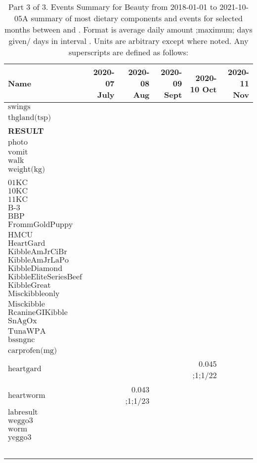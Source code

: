 \begin{table}[H]
\centering
\begin{tabular}{|l|r|r|r|r|r|}
\hline
Name&2020-07 July&2020-08 Aug&2020-09 Sept&2020-10 Oct&2020-11 Nov\\
\hline
$\textrm{swings}$&&&&&\\
$\textrm{thgland(tsp)}$&&&&&\\
{\bf RESULT}&&&&&\\
$\textrm{photo}$&&&&&\\
$\textrm{vomit}$&&&&&\\
$\textrm{walk}$&&&&&\\
$\textrm{weight(kg)}$&&&&&\\
&&&&&\\
$\textrm{01KC}$&&&&&\\
$\textrm{10KC}$&&&&&\\
$\textrm{11KC}$&&&&&\\
$\textrm{B-3}$&&&&&\\
$\textrm{BBP}$&&&&&\\
$\textrm{FrommGoldPuppy}$&&&&&\\
$\textrm{HMCU}$&&&&&\\
$\textrm{HeartGard}$&&&&&\\
$\textrm{KibbleAmJrCiBr}$&&&&&\\
$\textrm{KibbleAmJrLaPo}$&&&&&\\
$\textrm{KibbleDiamond}$&&&&&\\
$\textrm{KibbleEliteSeriesBeef}$&&&&&\\
$\textrm{KibbleGreat}$&&&&&\\
$\textrm{Misckibbleonly}$&&&&&\\
$\textrm{Misckibble}$&&&&&\\
$\textrm{RcanineGIKibble}$&&&&&\\
$\textrm{SnAgOx}$&&&&&\\
$\textrm{TunaWPA}$&&&&&\\
$\textrm{bssngnc}$&&&&&\\
$\textrm{carprofen(mg)}$&&&&&\\
$\textrm{heartgard}$&&&&0.045 ;1;1/22&\\
$\textrm{heartworm}$&&0.043 ;1;1/23&&&\\
$\textrm{labresult}$&&&&&\\
$\textrm{weggo3}$&&&&&\\
$\textrm{worm}$&&&&&\\
$\textrm{yeggo3}$&&&&&\\
&&&&&\\
&&&&&\\
&&&&&\\
&&&&&\\
&&&&&\\
\hline
\end{tabular}
\caption{Part 3 of 3.  Events Summary for Beauty   from 2018-01-01 to 2021-10-05A summary of most dietary components and events  for selected months between \mjmdatemin and \mjmdatemax. Format is average daily amount ;maximum; days given/ days in interval . Units are arbitrary except where noted. Any  superscripts are defined as follows:  \mjmsuperscripts}
\end{table}
